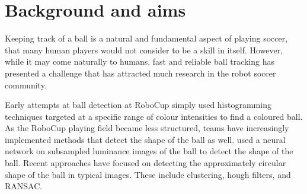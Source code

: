 \documentclass[11pt]{scrartcl}
\begin{document}
	\section{Background and aims} {




  		Keeping track of a ball is a natural and fundamental aspect of playing 
  		soccer, that many human players would not consider to be a skill in itself. 
  		However, while it may come naturally to humans, fast and reliable ball
        tracking has presented a challenge that has attracted much research in
        the robot soccer community.
        

        Early attempts at ball detection at RoboCup simply used histogramming
        techniques targeted at a specific range of colour intensities to find
        a coloured ball. As the RoboCup playing field became less structured,
        teams have increasingly implemented methods that detect the shape of
        the ball as well.
        \citet{schulz2007ball} used a neural network on
        subsampled luminance images of the ball to detect the shape of the 
        ball. Recent approaches have focused on detecting the approximately
        circular shape of the ball in typical images. These include
        clustering, hough filters, and RANSAC.

}
\end{document}
